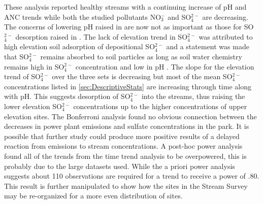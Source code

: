 These analysis reported healthy streams with a continuing increase of pH and ANC trends while both the studied pollutants NO$_3^-$ and SO$_4^{2-}$ are decreasing.  
The concerns of lowering pH raised in \citet{robinson2008ph} are now not as important as those for SO$_4^{2-}$ desorption raised in \citet{cai2013}.  
The lack of elevation trend in SO$_4^{2-}$ was attributed to high elevation soil adsorption of depositional SO$_4^{2-}$ and a statement was made that SO$_4^{2-}$ remains absorbed to soil particles as long as soil water chemistry remains high in SO$_4^{2-}$ concentration and low in pH \citep{cai2011long}.  
The slope for the elevation trend of SO$_4^{2-}$ over the three sets is decreasing but most of the mean SO$_4^{2-}$ concentrations listed in \autoref{sec:DescriptiveStats} are increasing through time along with pH.
This suggests desorption of SO$_4^{2-}$ into the streams, thus raising the lower elevation SO$_4^{2-}$ concentrations up to the higher concentrations of upper elevation sites.
The Bonferroni analysis found no obvious connection between the decreases in power plant emissions and sulfate concentrations in the park.
It is possible that further study could produce more positive results of a delayed reaction from emissions to stream concentrations.
A post-hoc power analysis found all of the trends from the time trend analysis to be overpowered, this is probably due to the large datasets used.
While the a priori power analysis suggests about 110 observations are required for a trend to receive a power of .80.
This result is further manipulated to show how the sites in the Stream Survey may be re-organized for a more even distribution of sites.


 




